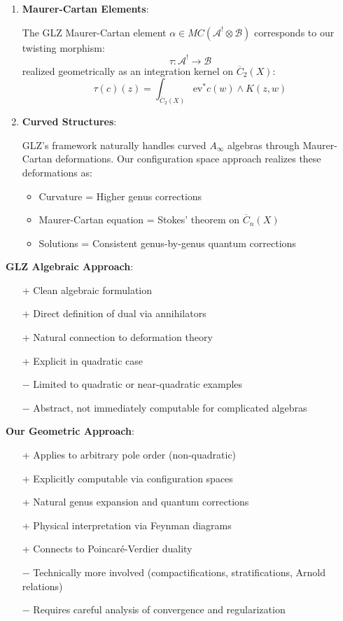 \begin{example}
\begin{theorem}
\begin{enumerate}
\item \textbf{Maurer-Cartan Elements}:
   
   The GLZ Maurer-Cartan element $\alpha \in MC(\mathcal{A}^! \otimes \mathcal{B})$ corresponds 
   to our twisting morphism:
   $$\tau: \mathcal{A}^! \to \mathcal{B}$$
   realized geometrically as an integration kernel on $\overline{C}_2(X)$:
   $$\tau(c)(z) = \int_{\overline{C}_2(X)} \text{ev}^* c(w) \wedge K(z, w)$$

\item \textbf{Curved Structures}:
   
   GLZ's framework naturally handles curved $A_{\infty}$ algebras through Maurer-Cartan 
   deformations. Our configuration space approach realizes these deformations as:
   \begin{itemize}
   \item Curvature = Higher genus corrections
   \item Maurer-Cartan equation = Stokes' theorem on $\overline{C}_n(X)$
   \item Solutions = Consistent genus-by-genus quantum corrections
   \end{itemize}
\end{enumerate}
\end{theorem}

\begin{remark}
\label{rem:advantages-comparison}

\textbf{GLZ Algebraic Approach}:
\begin{itemize}
\item[+] Clean algebraic formulation
\item[+] Direct definition of dual via annihilators
\item[+] Natural connection to deformation theory
\item[+] Explicit in quadratic case
\item[−] Limited to quadratic or near-quadratic examples
\item[−] Abstract, not immediately computable for complicated algebras
\end{itemize}

\textbf{Our Geometric Approach}:
\begin{itemize}
\item[+] Applies to arbitrary pole order (non-quadratic)
\item[+] Explicitly computable via configuration spaces
\item[+] Natural genus expansion and quantum corrections
\item[+] Physical interpretation via Feynman diagrams
\item[+] Connects to Poincaré-Verdier duality
\item[−] Technically more involved (compactifications, stratifications, Arnold relations)
\item[−] Requires careful analysis of convergence and regularization
\end{itemize}


\end{remark}
\end{example}
